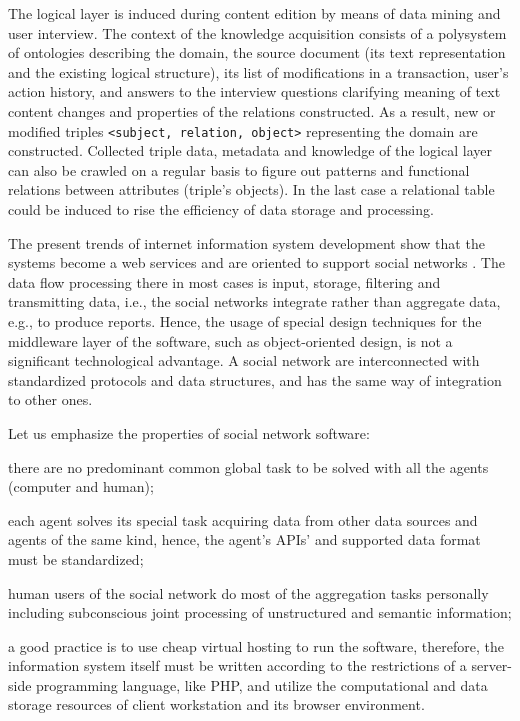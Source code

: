 \documentclass[conference]{IEEEtran}
\begin{document}
The logical layer is induced during content edition by means of data
mining and user interview.  The context of the knowledge acquisition
consists of a polysystem \cite{father} of ontologies describing the
domain, the source document (its text representation and the existing
logical structure), its list of modifications in a transaction, user's
action history, and answers to the interview questions clarifying
meaning of text content changes and properties of the relations
constructed.  As a result, new or modified triples \texttt{<subject,
  relation, object>} representing the domain are constructed.
Collected triple data, metadata and knowledge of the logical layer can
also be crawled on a regular basis to figure out patterns and
functional relations between attributes (triple's objects).  In the
last case a relational table could be induced to rise the efficiency
of data storage and processing.

The present trends of internet information system development show
that the systems become a web services and are oriented to support
social networks \cite{SN}.  The data flow processing there in most
cases is input, storage, filtering and transmitting data, i.e., the
social networks integrate rather than aggregate data, e.g., to produce
reports.  Hence, the usage of special design techniques for the
middleware layer of the software, such as object-oriented design, is
not a significant technological advantage.  A social network are
interconnected with standardized protocols and data structures, and
has the same way of integration to other ones.

Let us emphasize the properties of social network software:
\begin{IEEEitemize}[\IEEEsetlabelwidth{Z}]
\item there are no predominant common global task to be solved with
  all the agents (computer and human);
\item each agent solves its special task acquiring data from other
  data sources and agents of the same kind, hence, the agent's APIs’ and
  supported data format must be standardized;
\item human users of the social network do most of the aggregation
  tasks personally including subconscious joint processing of
  unstructured and semantic information;
\item a good practice is to use cheap virtual hosting to run the
  software, therefore, the information system itself must be written
  according to the restrictions of a server-side programming language,
  like PHP, and utilize the computational and data storage resources
  of client workstation and its browser environment.
\end{IEEEitemize}
\end{document}
